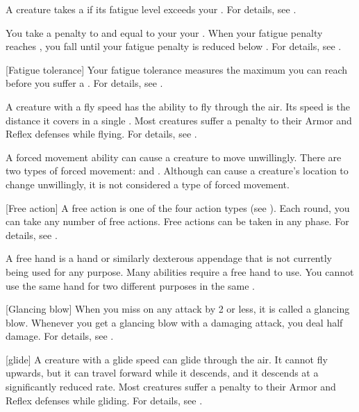  A creature takes a  if its fatigue level exceeds your .
For details, see .

 You take a penalty to  and  equal to your  \sub your .
When your fatigue penalty reaches , you fall \unconscious until your fatigue penalty is reduced below .
For details, see .

[Fatigue tolerance] Your fatigue tolerance measures the maximum  you can reach before you suffer a .
For details, see .

 A creature with a fly speed has the ability to fly through the air.
Its speed is the distance it covers in a single .
Most creatures suffer a  penalty to their Armor and Reflex defenses while flying.
For details, see .

 A forced movement ability can cause a creature to move unwillingly.
There are two types of forced movement:  and .
Although  can cause a creature's location to change unwillingly, it is not considered a type of forced movement.

[Free action] A free action is one of the four action types (see ).
Each round, you can take any number of free actions.
Free actions can be taken in any phase.
For details, see .

 A free hand is a hand or similarly dexterous appendage that is not currently being used for any purpose.
Many abilities require a free hand to use.
You cannot use the same hand for two different purposes in the same .

[Glancing blow] When you miss on any attack by 2 or less, it is called a glancing blow.
Whenever you get a glancing blow with a damaging attack, you deal half damage.
For details, see .

[glide] A creature with a glide speed can glide through the air.
It cannot fly upwards, but it can travel forward while it descends, and it descends at a significantly reduced rate.
Most creatures suffer a  penalty to their Armor and Reflex defenses while gliding.
For details, see .

